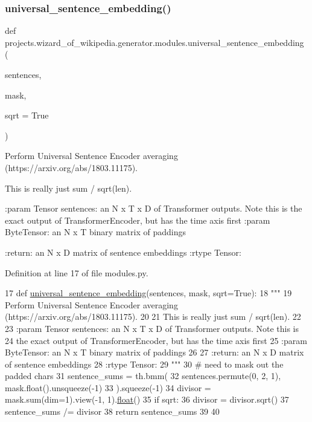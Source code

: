 \subsubsection{\texorpdfstring{universal\+\_\+sentence\+\_\+embedding()}{universal\_sentence\_embedding()}}
{\footnotesize\ttfamily def projects.\+wizard\+\_\+of\+\_\+wikipedia.\+generator.\+modules.\+universal\+\_\+sentence\+\_\+embedding (\begin{DoxyParamCaption}\item[{}]{sentences,  }\item[{}]{mask,  }\item[{}]{sqrt = {\ttfamily True} }\end{DoxyParamCaption})}

\begin{DoxyVerb}Perform Universal Sentence Encoder averaging (https://arxiv.org/abs/1803.11175).

This is really just sum / sqrt(len).

:param Tensor sentences: an N x T x D of Transformer outputs. Note this is
    the exact output of TransformerEncoder, but has the time axis first
:param ByteTensor: an N x T binary matrix of paddings

:return: an N x D matrix of sentence embeddings
:rtype Tensor:
\end{DoxyVerb}
 

Definition at line 17 of file modules.\+py.


\begin{DoxyCode}
17 \textcolor{keyword}{def }\hyperlink{namespaceprojects_1_1wizard__of__wikipedia_1_1generator_1_1modules_aa0e28a2592caa75f5c687c6200d2a68d}{universal\_sentence\_embedding}(sentences, mask, sqrt=True):
18     \textcolor{stringliteral}{"""}
19 \textcolor{stringliteral}{    Perform Universal Sentence Encoder averaging (https://arxiv.org/abs/1803.11175).}
20 \textcolor{stringliteral}{}
21 \textcolor{stringliteral}{    This is really just sum / sqrt(len).}
22 \textcolor{stringliteral}{}
23 \textcolor{stringliteral}{    :param Tensor sentences: an N x T x D of Transformer outputs. Note this is}
24 \textcolor{stringliteral}{        the exact output of TransformerEncoder, but has the time axis first}
25 \textcolor{stringliteral}{    :param ByteTensor: an N x T binary matrix of paddings}
26 \textcolor{stringliteral}{}
27 \textcolor{stringliteral}{    :return: an N x D matrix of sentence embeddings}
28 \textcolor{stringliteral}{    :rtype Tensor:}
29 \textcolor{stringliteral}{    """}
30     \textcolor{comment}{# need to mask out the padded chars}
31     sentence\_sums = th.bmm(
32         sentences.permute(0, 2, 1), mask.float().unsqueeze(-1)
33     ).squeeze(-1)
34     divisor = mask.sum(dim=1).view(-1, 1).\hyperlink{namespaceprojects_1_1controllable__dialogue_1_1make__control__dataset_aa2b7207688c641dbc094ab44eca27113}{float}()
35     \textcolor{keywordflow}{if} sqrt:
36         divisor = divisor.sqrt()
37     sentence\_sums /= divisor
38     \textcolor{keywordflow}{return} sentence\_sums
39 
40 
\end{DoxyCode}
